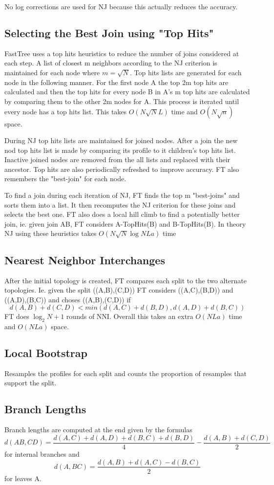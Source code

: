 \documentclass[a4paper]{article}
\begin{document}
No log corrections are used for NJ because this actually reduces the accuracy. 

\subsection{Selecting the Best Join using "Top Hits"}

FastTree uses a top hits heuristics to reduce the number of joins considered at each step. A list of closest m neighbors according to the NJ criterion is maintained for each node where $m = \sqrt{N}$. Top hits lists are generated for each node in the following manner. For the first node A the top 2m top hits are calculated and then the top hits for every node B in A's m top hits are calculated by comparing them to the other 2m nodes for A. This process is iterated until every node has a top hits list. This takes $O(N\sqrt{N}L)$ time and $O(N\sqrt{n})$ space. 

During NJ top hits lists are maintained for joined nodes. After a join the new nod top hits list is made by comparing its profile to it children's top hits list. Inactive joined nodes are removed from the all lists and replaced with their ancestor. Top hits are also periodically refreshed to improve accuracy. FT also remembers the "best-join" for each node. 

To find a join during each iteration of NJ, FT finds the top m "best-joins" and sorts them into a list. It then recomputes the NJ criterion for these joins and selects the best one. FT also does a local hill climb to find a potentially better join, ie. given join AB, FT considers A-TopHits(B) and B-TopHits(B). In theory NJ using these heuristics takes $O(N\sqrt{N}\log{N}La)$ time 
\subsection{Nearest Neighbor Interchanges }

After the initial topology is created, FT compares each split to the two alternate topologies. Ie. given the split ((A,B),(C,D)) FT considers ((A,C),(B,D)) and ((A,D),(B,C)) and choses ((A,B),(C,D)) if 
\[d(A,B) + d(C,D) < min(d(A,C) + d(B,D), d(A,D) + d(B,C))\]
FT does $\log_{2}{N} + 1$ rounds of NNI. Overall this takes an extra $O(NLa)$ time and $O(NLa)$ space. 

\subsection{Local Bootstrap} 

Resamples the profiles for each split and counts the proportion of resamples that support the split. 

\subsection{Branch Lengths}

Branch lengths are computed at the end given by the formulas 
\[d(AB,CD) = \frac{d(A,C) + d(A,D) + d(B,C) + d(B,D)}{4} - \frac{d(A,B)+d(C,D)}{2}\]
for internal branches and 
\[d(A,BC) = \frac{d(A,B) + d(A,C) - d(B,C)}{2} \]
for leaves A. 
\end{document}
